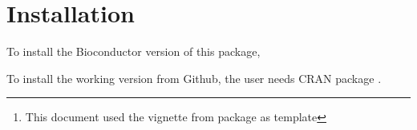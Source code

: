 \documentclass[12pt]{article}
\author{Kushal K Dey, Chiaowen Joyce Hsiao \& Matthew Stephens \\[1em]
\small{\textit{Stephens Lab}, The University of Chicago} \mbox{ }\\
\small{\texttt{$^*$Correspondending Email: mstephens@uchicago.edu}}}
\newcommand{\singlecellRNAseqData}{\textit{singlecellRNAseqData}}
\begin{document}
\maketitle

\begin{abstract}
\vspace{1em}
 This package includes three single-cell RNA-seq data sets: 1) Mouse spleen cells due to Jaitin et al 2014 \cite{Jaitin2014}, 2) Mouse preimplantation embryos due to Deng et al
 2014 \cite{Deng2014}, and 3) Mouse cortex and hippocampus cells data due to
 Zeisel et al 2015 \cite{Zeisel2015}. Each data set is stored in an \textit{ExpressionSet} objects. We previously analyzed Jaitin et al and Deng et al in the manuscript entitled "Clustering RNA-seq expression data using grade of membership models", Kushal K Dey, Chiaowen Joyce Hsiao, and Matthew Stephens (2016).

\vspace{1em}
\textbf{\singlecellRNAseqData{} version:} 0.99.0 \footnote{This document used the vignette from \Bioconductor{} package  as  template}
\end{abstract}




\newpage

\tableofcontents

\section{Installation}

To install the Bioconductor version of this package,

\begin{knitrout}
\color{fgcolor}\begin{kframe}
\begin{alltt}
\hlstd{(}\hlstd{)}
\hlstd{(}\hlstd{)}
\end{alltt}
\end{kframe}
\end{knitrout}

To install the working version from Github, the user needs CRAN package
.

\begin{knitrout}
\color{fgcolor}\begin{kframe}
\begin{alltt}
\hlstd{(}\hlstd{)}
\end{alltt}
\end{kframe}
\end{knitrout}
\end{document}
